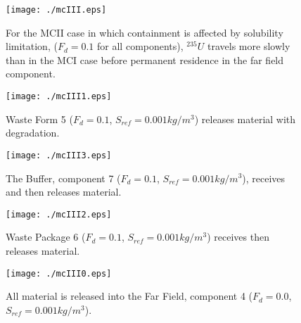 
\begin{figure}[ht]
\centering
\texttt{[image: ./mcIII.eps]}
\caption[$^{235}U$ residence. Mixed Cell Coupled Sorption and Solubility Limitation.]{
For the MCII case in which containment is affected by solubility limitation, 
($F_{d}=0.1$ for all components), $^{235}U$ travels more slowly than in the MCI case 
before permanent residence in the far field component.
}
\label{fig:mcIIIall}
\begin{minipage}[b]{0.45\linewidth}

  \texttt{[image: ./mcIII1.eps]}
  \caption[Case MCII Waste Form Contaminants.]{
    Waste Form 5 ($F_d = 0.1$, $S_{ref} = 0.001kg/m^3$) releases material with degradation. 
    }
  \label{fig:mcIIIwf5}
  
  \texttt{[image: ./mcIII3.eps]}
  \caption[Case MCII Buffer Contaminants]{
    The Buffer, component 7 ($F_d=0.1$, $S_{ref}=0.001kg/m^3$), receives and then releases material.
    }
  \label{fig:mcIIIbuff}

\end{minipage}
\hspace{0.05\linewidth}
\begin{minipage}[b]{0.45\linewidth}
  \texttt{[image: ./mcIII2.eps]}
  \caption[Case MCII Waste Package Contaminants.]{ 
    Waste Package 6 ($F_d = 0.1$, $S_{ref}=0.001kg/m^3$) receives then releases material. 
    }
  \label{fig:mcIIIwp6}

  \texttt{[image: ./mcIII0.eps]}
  \caption[Case MCII Waste Package Contaminants.]{All material is released into 
    the Far Field, component 4 ($F_d=0.0$, $S_{ref} = 0.001kg/m^3$).}
  \label{fig:mcII}


  \end{minipage}
\end{figure}

